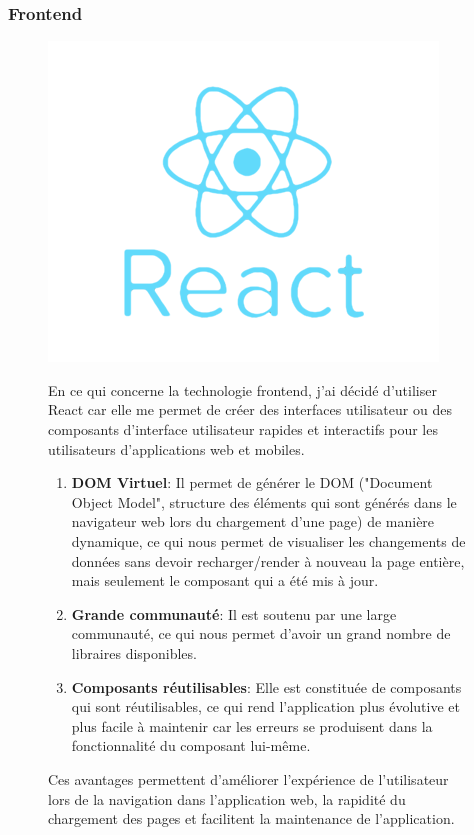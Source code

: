 \subsubsection{Frontend}
\begin{figure}[H]
  \begin{minipage}{.3\textwidth}
    \includegraphics[width=0.75\linewidth]{img/react.png}
  \end{minipage}
  \begin{minipage}{.7\textwidth}
    
    En ce qui concerne la technologie frontend, j'ai décidé d'utiliser React car elle me permet de créer des interfaces utilisateur ou des composants d'interface utilisateur rapides et interactifs pour les utilisateurs d'applications web et mobiles.
    \begin{enumerate}
      \item \textbf{DOM Virtuel}: Il permet de générer le DOM ("Document Object Model", structure des éléments qui sont générés dans le navigateur web lors du chargement d'une page) de manière dynamique, ce qui nous permet de visualiser les changements de données sans devoir recharger/render à nouveau la page entière, mais seulement le composant qui a été mis à jour.
      \item \textbf{Grande communauté}: Il est soutenu par une large communauté, ce qui nous permet d'avoir un grand nombre de libraires disponibles.
      \item \textbf{Composants réutilisables}: Elle est constituée de composants qui sont réutilisables, ce qui rend l'application plus évolutive et plus facile à maintenir car les erreurs se produisent dans la fonctionnalité du composant lui-même.
    \end{enumerate}
    Ces avantages permettent d'améliorer l'expérience de l'utilisateur lors de la navigation dans l'application web, la rapidité du chargement des pages et facilitent la maintenance de l'application.
  \end{minipage}
\end{figure}

